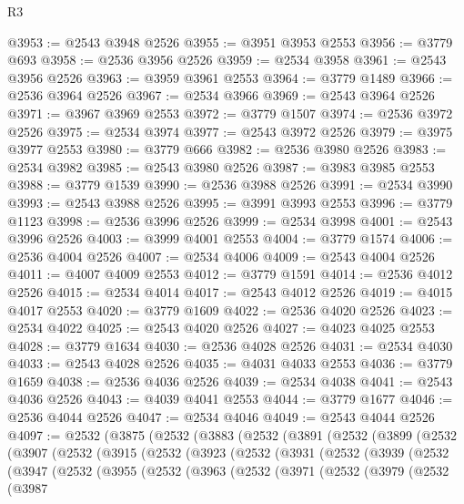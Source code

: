 \begin{lexlean}{R3}
\begin{coremodule}
@3953 := @2543 @3948 @2526
@3955 := @3951 @3953 @2553
@3956 := @3779 @693
@3958 := @2536 @3956 @2526
@3959 := @2534 @3958
@3961 := @2543 @3956 @2526
@3963 := @3959 @3961 @2553
@3964 := @3779 @1489
@3966 := @2536 @3964 @2526
@3967 := @2534 @3966
@3969 := @2543 @3964 @2526
@3971 := @3967 @3969 @2553
@3972 := @3779 @1507
@3974 := @2536 @3972 @2526
@3975 := @2534 @3974
@3977 := @2543 @3972 @2526
@3979 := @3975 @3977 @2553
@3980 := @3779 @666
@3982 := @2536 @3980 @2526
@3983 := @2534 @3982
@3985 := @2543 @3980 @2526
@3987 := @3983 @3985 @2553
@3988 := @3779 @1539
@3990 := @2536 @3988 @2526
@3991 := @2534 @3990
@3993 := @2543 @3988 @2526
@3995 := @3991 @3993 @2553
@3996 := @3779 @1123
@3998 := @2536 @3996 @2526
@3999 := @2534 @3998
@4001 := @2543 @3996 @2526
@4003 := @3999 @4001 @2553
@4004 := @3779 @1574
@4006 := @2536 @4004 @2526
@4007 := @2534 @4006
@4009 := @2543 @4004 @2526
@4011 := @4007 @4009 @2553
@4012 := @3779 @1591
@4014 := @2536 @4012 @2526
@4015 := @2534 @4014
@4017 := @2543 @4012 @2526
@4019 := @4015 @4017 @2553
@4020 := @3779 @1609
@4022 := @2536 @4020 @2526
@4023 := @2534 @4022
@4025 := @2543 @4020 @2526
@4027 := @4023 @4025 @2553
@4028 := @3779 @1634
@4030 := @2536 @4028 @2526
@4031 := @2534 @4030
@4033 := @2543 @4028 @2526
@4035 := @4031 @4033 @2553
@4036 := @3779 @1659
@4038 := @2536 @4036 @2526
@4039 := @2534 @4038
@4041 := @2543 @4036 @2526
@4043 := @4039 @4041 @2553
@4044 := @3779 @1677
@4046 := @2536 @4044 @2526
@4047 := @2534 @4046
@4049 := @2543 @4044 @2526
@4097 := @2532
    (@3875
      (@2532
        (@3883
          (@2532
            (@3891
              (@2532
                (@3899
                  (@2532
                    (@3907
                      (@2532
                        (@3915
                          (@2532
                            (@3923
                              (@2532
                                (@3931
                                  (@2532
                                    (@3939
                                      (@2532
                                        (@3947
                                          (@2532
                                            (@3955
                                              (@2532
                                                (@3963
                                                  (@2532
                                                    (@3971
                                                      (@2532
                                                        (@3979
                                                          (@2532
                                                            (@3987

\end{coremodule}
\end{lexlean}
